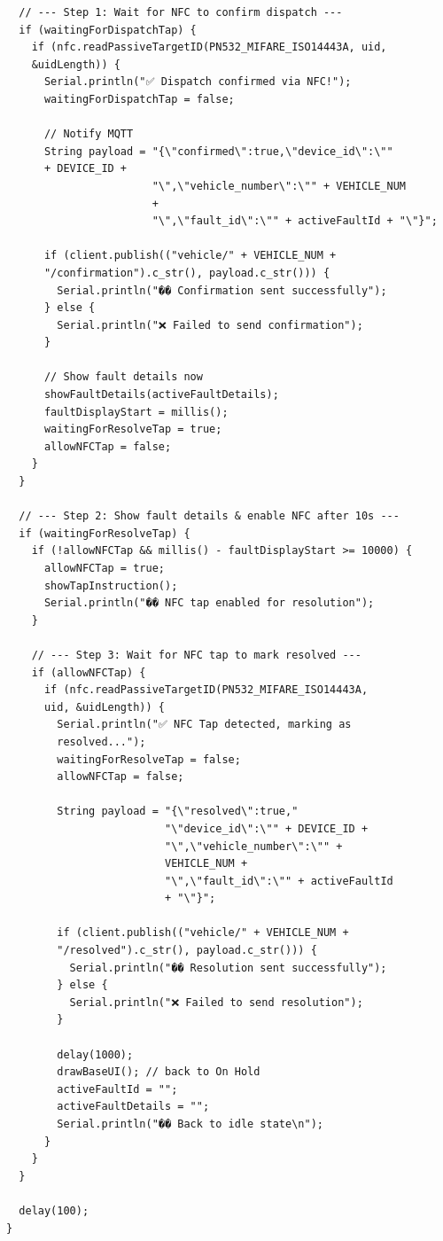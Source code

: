 \begin{lstlisting}
  // --- Step 1: Wait for NFC to confirm dispatch ---
  if (waitingForDispatchTap) {
    if (nfc.readPassiveTargetID(PN532_MIFARE_ISO14443A, uid, 
    &uidLength)) {
      Serial.println("✅ Dispatch confirmed via NFC!");
      waitingForDispatchTap = false;

      // Notify MQTT
      String payload = "{\"confirmed\":true,\"device_id\":\""
      + DEVICE_ID +
                       "\",\"vehicle_number\":\"" + VEHICLE_NUM 
                       +
                       "\",\"fault_id\":\"" + activeFaultId + "\"}";
      
      if (client.publish(("vehicle/" + VEHICLE_NUM + 
      "/confirmation").c_str(), payload.c_str())) {
        Serial.println("�� Confirmation sent successfully");
      } else {
        Serial.println("❌ Failed to send confirmation");
      }

      // Show fault details now
      showFaultDetails(activeFaultDetails);
      faultDisplayStart = millis();
      waitingForResolveTap = true;
      allowNFCTap = false;
    }
  }

  // --- Step 2: Show fault details & enable NFC after 10s ---
  if (waitingForResolveTap) {
    if (!allowNFCTap && millis() - faultDisplayStart >= 10000) {
      allowNFCTap = true;
      showTapInstruction();
      Serial.println("�� NFC tap enabled for resolution");
    }

    // --- Step 3: Wait for NFC tap to mark resolved ---
    if (allowNFCTap) {
      if (nfc.readPassiveTargetID(PN532_MIFARE_ISO14443A, 
      uid, &uidLength)) {
        Serial.println("✅ NFC Tap detected, marking as
        resolved...");
        waitingForResolveTap = false;
        allowNFCTap = false;

        String payload = "{\"resolved\":true,"
                         "\"device_id\":\"" + DEVICE_ID +
                         "\",\"vehicle_number\":\"" + 
                         VEHICLE_NUM +
                         "\",\"fault_id\":\"" + activeFaultId
                         + "\"}";
        
        if (client.publish(("vehicle/" + VEHICLE_NUM +
        "/resolved").c_str(), payload.c_str())) {
          Serial.println("�� Resolution sent successfully");
        } else {
          Serial.println("❌ Failed to send resolution");
        }

        delay(1000);
        drawBaseUI(); // back to On Hold
        activeFaultId = "";
        activeFaultDetails = "";
        Serial.println("�� Back to idle state\n");
      }
    }
  }

  delay(100);
}
\end{lstlisting}
